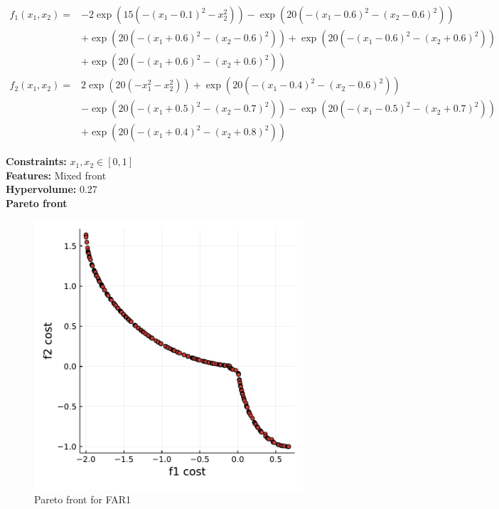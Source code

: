 \documentclass[11pt,oneside,onecolumn,openright]{article}
\begin{document}
  \begin{equation}
  \begin{aligned}
  f_{1}\left(x_{1}, x_{2}\right)=&-2 \exp \left(15\left(-\left(x_{1}-0.1\right)^{2}-x_{2}^{2}\right)\right)-\exp \left(20\left(-\left(x_{1}-0.6\right)^{2}-\left(x_{2}-0.6\right)^{2}\right)\right) \\
  &+\exp \left(20\left(-\left(x_{1}+0.6\right)^{2}-\left(x_{2}-0.6\right)^{2}\right)\right)+\exp \left(20\left(-\left(x_{1}-0.6\right)^{2}-\left(x_{2}+0.6\right)^{2}\right)\right) \\
  &+\exp \left(20\left(-\left(x_{1}+0.6\right)^{2}-\left(x_{2}+0.6\right)^{2}\right)\right) \\
  f_{2}\left(x_{1}, x_{2}\right)=& 2 \exp \left(20\left(-x_{1}^{2}-x_{2}^{2}\right)\right) +\exp \left(20\left(-\left(x_{1}-0.4\right)^{2}-\left(x_{2}-0.6\right)^{2}\right)\right) \\
  &-\exp \left(20\left(-\left(x_{1}+0.5\right)^{2}-\left(x_{2}-0.7\right)^{2}\right)\right)-\exp \left(20\left(-\left(x_{1}-0.5\right)^{2}-\left(x_{2}+0.7\right)^{2}\right)\right) \\
  &+\exp \left(20\left(-\left(x_{1}+0.4\right)^{2}-\left(x_{2}+0.8\right)^{2}\right)\right)
  \end{aligned}
  \end{equation}

  \noindent\textbf{Constraints: } $x_1, x_2\in [0,1]$\\
  \noindent\textbf{Features: } Mixed front\\
  \noindent\textbf{Hypervolume: } 0.27\\
  \noindent\textbf{Pareto front}
      \begin{figure}[H]
      \centering
      \includegraphics[width=10cm]{fig/FAR1.pdf}
      \cprotect\caption{Pareto front for FAR1}
      \end{figure}
\end{document}
